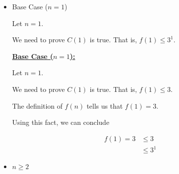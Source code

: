 \documentclass[12pt]{article}
\begin{document}
\begin{itemize}
\begin{mdframed}
\begin{itemize}
            \item Base Case ($n = 1$)

            Let $n = 1$.

            \bigskip

            We need to prove $C(1)$ is true. That is, $f(1) \leq 3^1$.

            \begin{mdframed}

            \underline{\textbf{Base Case ($n = 1$):}}

            \bigskip

            Let $n = 1$.

            \bigskip

            We need to prove $C(1)$ is true. That is, $f(1) \leq 3$.

            \bigskip

            The definition of $f(n)$ tells us that $f(1) = 3$.

            \bigskip

            Using this fact, we can conclude

            \begin{align}
                f(1) = 3 &\leq 3\\
                &\leq 3^1
            \end{align}

            \end{mdframed}

            \item $n \geq 2$
        \end{itemize}
    \end{mdframed}
\end{itemize}
\end{document}
